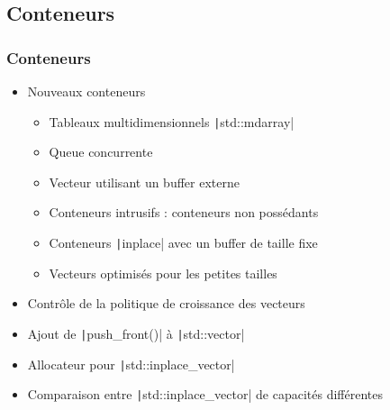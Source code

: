 \documentclass[C++.tex]{subfiles}
\begin{document}
\subsection*{Conteneurs}
\begin{frame}[fragile]
	\frametitle{Conteneurs}
	\begin{itemize}
		\item Nouveaux conteneurs
		\begin{itemize}
			\item Tableaux multidimensionnels \texttt|std::mdarray|
			\item Queue concurrente
			\item Vecteur utilisant un buffer externe
			\item Conteneurs intrusifs : conteneurs non possédants


			\item Conteneurs \texttt|inplace| avec un buffer de taille fixe
			\item Vecteurs optimisés pour les petites tailles
		\end{itemize}
		\item Contrôle de la politique de croissance des vecteurs
		\item Ajout de \texttt|push_front()| à \texttt|std::vector|
		\item Allocateur pour \texttt|std::inplace_vector|
		\item Comparaison entre \texttt|std::inplace_vector| de capacités différentes
	\end{itemize}

\end{frame}
\end{document}
